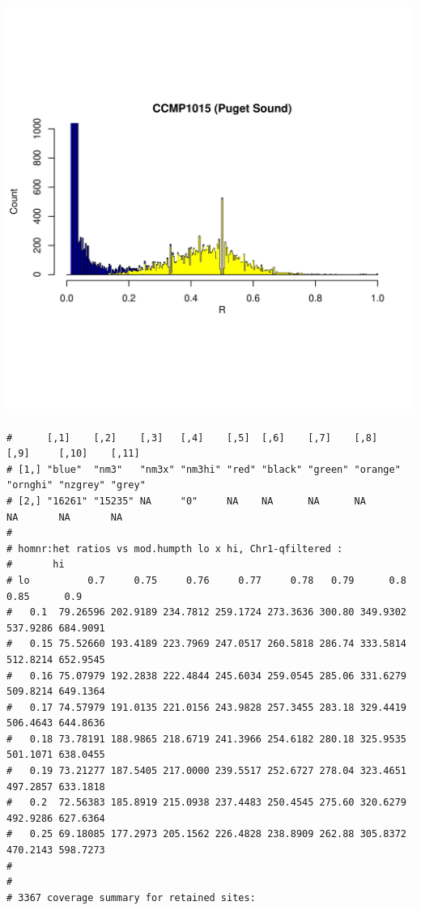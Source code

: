 \documentclass{article}\usepackage[]{graphicx}\usepackage[]{color}
\makeatletter
\def\maxwidth{ %
  \ifdim\Gin@nat@width>\linewidth
    \linewidth
  \else
    \Gin@nat@width
  \fi
}
\newenvironment{kframe}{%
 \def\at@end@of@kframe{}%
 \ifinner\ifhmode%
  \def\at@end@of@kframe{\end{minipage}}%
  \begin{minipage}{\columnwidth}%
 \fi\fi%
 \def\FrameCommand##1{\hskip\@totalleftmargin \hskip-\fboxsep
 \colorbox{shadecolor}{##1}\hskip-\fboxsep
     \hskip-\linewidth \hskip-\@totalleftmargin \hskip\columnwidth}%
 \MakeFramed {\advance\hsize-\width
   \@totalleftmargin\z@ \linewidth\hsize
   \@setminipage}}%
 {\par\unskip\endMakeFramed%
 \at@end@of@kframe}
\newenvironment{knitrout}{}{} %
\makeatother
\begin{document}
\begin{knitrout}
\includegraphics[width=\maxwidth]{FigS7-hwe-histo-figs-knitr/unnamed-chunk-10-51} 
\begin{kframe}\begin{verbatim}
#      [,1]    [,2]    [,3]   [,4]    [,5]  [,6]    [,7]    [,8]     [,9]     [,10]    [,11] 
# [1,] "blue"  "nm3"   "nm3x" "nm3hi" "red" "black" "green" "orange" "ornghi" "nzgrey" "grey"
# [2,] "16261" "15235" NA     "0"     NA    NA      NA      NA       NA       NA       NA
# 
# homnr:het ratios vs mod.humpth lo x hi, Chr1-qfiltered :
#       hi
# lo          0.7     0.75     0.76     0.77     0.78   0.79      0.8     0.85      0.9
#   0.1  79.26596 202.9189 234.7812 259.1724 273.3636 300.80 349.9302 537.9286 684.9091
#   0.15 75.52660 193.4189 223.7969 247.0517 260.5818 286.74 333.5814 512.8214 652.9545
#   0.16 75.07979 192.2838 222.4844 245.6034 259.0545 285.06 331.6279 509.8214 649.1364
#   0.17 74.57979 191.0135 221.0156 243.9828 257.3455 283.18 329.4419 506.4643 644.8636
#   0.18 73.78191 188.9865 218.6719 241.3966 254.6182 280.18 325.9535 501.1071 638.0455
#   0.19 73.21277 187.5405 217.0000 239.5517 252.6727 278.04 323.4651 497.2857 633.1818
#   0.2  72.56383 185.8919 215.0938 237.4483 250.4545 275.60 320.6279 492.9286 627.6364
#   0.25 69.18085 177.2973 205.1562 226.4828 238.8909 262.88 305.8372 470.2143 598.7273
# 
# 
# 3367 coverage summary for retained sites:

\end{verbatim}
\end{kframe}
\end{knitrout}
\end{document}
